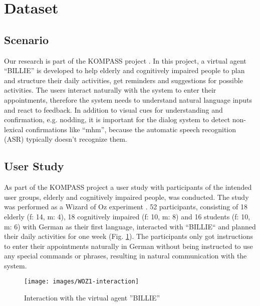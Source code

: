 \documentclass[letterpaper]{article}
\begin{document}
\section{Dataset}
\subsection{Scenario}
Our research is part of the KOMPASS project \cite{YaghoubzadehBuschmeier2015}. In this project, a virtual agent ``BILLIE'' is developed to help elderly and cognitively impaired people to plan and structure their daily activities, get reminders and suggestions for possible activities. The users interact naturally with the system to enter their appointments, therefore the system needs to understand natural language inputs and react to feedback. In addition to visual cues for understanding and confirmation, e.g. nodding, it is important for the dialog system to detect non-lexical confirmations like ``mhm'', because the automatic speech recognition (ASR) typically doesn't recognize them.
\subsection{User Study}
As part of the KOMPASS project a user study with participants of the intended user groups, elderly and cognitively impaired people, was conducted. The study was performed as a Wizard of Oz experiment \cite{Kelley1984}. 52 participants, consisting of 18 elderly (f: 14, m: 4), 18 cognitively impaired (f: 10, m: 8) and 16 students (f: 10, m: 6) with German as their first language, interacted with ``BILLIE`` and planned their daily activities for one week (Fig. \ref{fig:WOZ1-interaction}). The participants only got instructions to enter their appointments naturally in German without being instructed to use any special commands or phrases, resulting in natural communication with the system.

\begin{figure}[t]
	\centering
	\texttt{[image: images/WOZ1-interaction]}
	\caption{Interaction with the virtual agent ''BILLIE''}
	\label{fig:WOZ1-interaction}
\end{figure}
\end{document}
